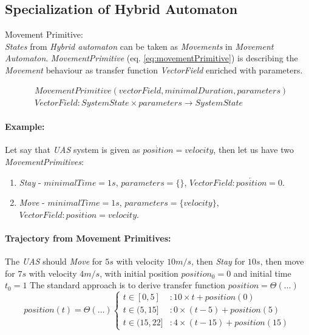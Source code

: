\subsection{Specialization of Hybrid Automaton}\label{s:MovementAutomatonBuidlingBlocks}
    \begin{definition}{Movement Primitive:}\label{def:MovementPrimitive}\\\emph{States} from \emph{Hybrid automaton} can be taken as \emph{Movements} in \emph{Movement Automaton}. \emph{MovementPrimitive} (eq. \ref{eq:movementPrimitive}) is describing the \emph{Movement} behaviour as transfer function \emph{VectorField} enriched with parameters. 

    \begin{equation}\label{eq:movementPrimitive}
        \begin{aligned}
            &MovementPrimitive(vectorField,minimalDuration,parameters)\\
            &VectorField:SystemState\times parameters \to SystemState
        \end{aligned}
    \end{equation}
    \end{definition}



    \paragraph{Example: }Let say that \emph{UAS} system is given as $\dot{position}=velocity$, then let us have two \emph{MovementPrimitives}:
    
    \begin{enumerate}
        \item \textit{Stay} - $minimalTime=1s$, $parameters=\{\}$, $VectorField:\dot{position}=0$.
        \item \textit{Move} - $minimalTime=1s$, $parameters=\{velocity\}$, $VectorField:\dot{position}=velocity$.
    \end{enumerate}
    
    \paragraph{Trajectory from Movement Primitives:} The \emph{UAS} should \emph{Move} for $5s$ with velocity $10 m/s$, then \emph{Stay} for $10s$, then move for $7s$ with velocity $4 m/s$, with initial position $position_0=0$ and initial time $t_0=1$ The standard approach is to derive transfer function $position = \Theta(\dots)$
    \begin{equation}\label{eq:trajectoryExample}
        position(t)=\Theta(\dots)
        \begin{cases}
            t \in [0,5] &: 10\times t + position(0)\\
            t \in (5,15] &: 0\times (t-5) + position(5)\\
            t \in (15,22]&: 4\times (t-15) + position(15)
        \end{cases}
    \end{equation}

